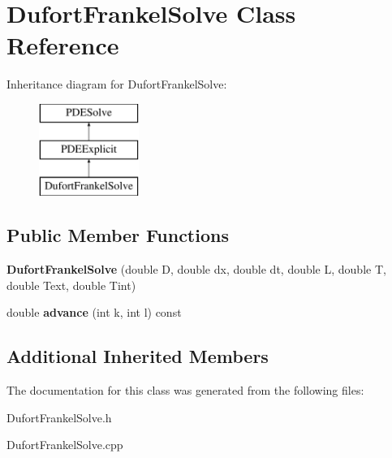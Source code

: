 \hypertarget{class_dufort_frankel_solve}{}\section{Dufort\+Frankel\+Solve Class Reference}
\label{class_dufort_frankel_solve}
Inheritance diagram for Dufort\+Frankel\+Solve\+:\begin{figure}[H]
\begin{center}
\leavevmode
\includegraphics[height=3.000000cm]{class_dufort_frankel_solve}
\end{center}
\end{figure}
\subsection*{Public Member Functions}
\begin{DoxyCompactItemize}
\item 
\mbox{\label{class_dufort_frankel_solve_a2081c0668116f15316e61f95c86bd644}} 
{\bfseries Dufort\+Frankel\+Solve} (double D, double dx, double dt, double L, double T, double Text, double Tint)
\item 
\mbox{\label{class_dufort_frankel_solve_ab89cf099385aa161de262fbe4db284d8}} 
double {\bfseries advance} (int k, int l) const
\end{DoxyCompactItemize}
\subsection*{Additional Inherited Members}


The documentation for this class was generated from the following files\+:\begin{DoxyCompactItemize}
\item 
Dufort\+Frankel\+Solve.\+h\item 
Dufort\+Frankel\+Solve.\+cpp\end{DoxyCompactItemize}
